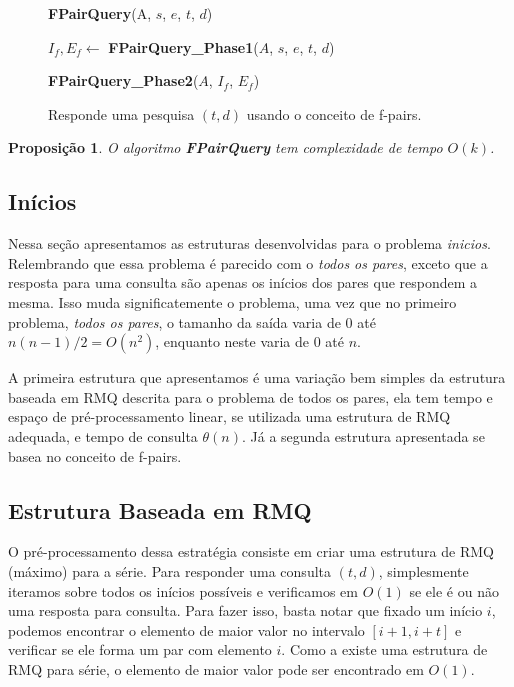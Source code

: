 \documentclass[12pt]{article}
\newtheorem{prop}[thm]{Proposição}
\begin{document}
\begin{figure}
\begin{framed}
{\bf FPairQuery}(A, $s$, $e$, $t$, $d$)

\hspace{1cm} $I_f, E_f \leftarrow$ {\bf FPairQuery\_Phase1}($A$, $s$, $e$, $t$, $d$)

\hspace{1cm} {\bf FPairQuery\_Phase2}($A$, $I_f$, $E_f$)
\end{framed}
\caption{Responde uma pesquisa $(t, d)$ usando o conceito de f-pairs.}
\label{fpairquery}
\end{figure}

\begin{prop}
O algoritmo {\bf FPairQuery} tem complexidade de tempo $O(k)$.
\end{prop}

\subsection{Inícios}

Nessa seção apresentamos as estruturas desenvolvidas para o problema \textit{inicios}.
Relembrando que essa problema é parecido com o \textit{todos os pares}, exceto que a
resposta para uma consulta são apenas os inícios dos pares que respondem a mesma. Isso
muda significatemente o problema, uma vez que no primeiro problema, \textit{todos os pares},
o tamanho da saída varia de $0$ até $n(n-1)/2 = O(n^2)$, enquanto neste varia de $0$ até $n$.

A primeira estrutura que apresentamos é uma variação bem simples da estrutura baseada
em RMQ descrita para o problema de todos os pares, ela tem tempo e espaço de pré-processamento
linear, se utilizada uma estrutura de RMQ adequada, e tempo de consulta $\theta(n)$. Já
a segunda estrutura apresentada se basea no conceito de f-pairs.

\subsection{Estrutura Baseada em RMQ}

O pré-processamento dessa estratégia consiste em criar uma estrutura de RMQ (máximo)
para a série. Para responder uma consulta $(t, d)$, simplesmente iteramos sobre todos
os inícios possíveis e verificamos em $O(1)$ se ele é ou não uma resposta para consulta.
Para fazer isso, basta notar que fixado um início $i$, podemos encontrar o elemento de maior valor
no intervalo $[i + 1, i + t]$ e verificar se ele forma um par com elemento $i$.
 Como a existe uma estrutura de RMQ para série, o elemento de maior valor
pode ser encontrado em $O(1)$.
\end{document}
